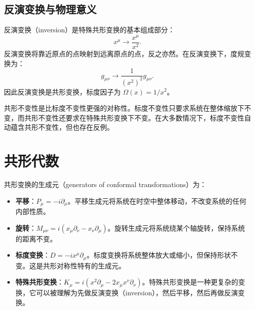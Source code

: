 \subsection{反演变换与物理意义}

\begin{definition}[反演变换]
反演变换（inversion）是特殊共形变换的基本组成部分：
\begin{equation}
    x^\mu \to \frac{x^\mu}{x^2}.
\end{equation}
反演变换将靠近原点的点映射到远离原点的点，反之亦然。在反演变换下，度规变换为：
\begin{equation}
    g_{\mu\nu} \to \frac{1}{(x^2)^2} g_{\mu\nu}.
\end{equation}
因此反演变换是共形变换，标度因子为 $\Omega(x) = 1/x^2$。
\end{definition}

\begin{remark}[共形不变性与标度不变性]
共形不变性是比标度不变性更强的对称性。标度不变性只要求系统在整体缩放下不变，而共形不变性还要求在特殊共形变换下不变。在大多数情况下，标度不变性自动蕴含共形不变性，但也存在反例。
\end{remark}

\section{共形代数}

\begin{definition}[共形变换的生成元]
共形变换的生成元（generators of conformal transformations）为：
\begin{itemize}
    \item \textbf{平移}：$P_\mu = -i\partial_\mu$。平移生成元将系统在时空中整体移动，不改变系统的任何内部性质。
    \item \textbf{旋转}：$M_{\mu\nu} = i(x_\mu \partial_\nu - x_\nu \partial_\mu)$。旋转生成元将系统绕某个轴旋转，保持系统的距离不变。
    \item \textbf{标度变换}：$D = -ix^\mu \partial_\mu$。标度变换将系统整体放大或缩小，但保持形状不变。这是共形对称性特有的生成元。
    \item \textbf{特殊共形变换}：$K_\mu = i(x^2 \partial_\mu - 2x_\mu x^\nu \partial_\nu)$。特殊共形变换是一种更复杂的变换，它可以被理解为先做反演变换（inversion），然后平移，然后再做反演变换。
\end{itemize}
\end{definition}

